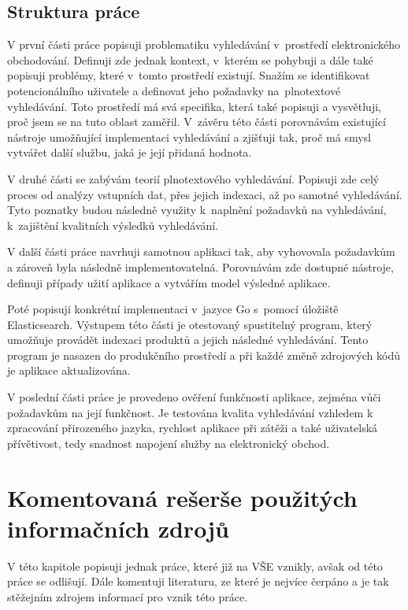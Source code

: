 \documentclass[FM,DP]{tulthesis}
\begin{document}
\section{Struktura práce}

V první části práce popisuji problematiku vyhledávání v~prostředí elektronického obchodování. 
Definuji zde jednak kontext, v~kterém se pohybuji a dále také popisuji problémy, 
které v~tomto prostředí existují. Snažím se identifikovat potencionálního uživatele 
a definovat jeho požadavky na~plnotextové vyhledávání. Toto prostředí má svá specifika, 
která také popisuji a vysvětluji, proč jsem se na tuto oblast zaměřil. V~závěru této části porovnávám
existující nástroje umožňující implementaci vyhledávání a zjišťuji tak, proč má smysl
vytvářet další službu, jaká je její přidaná hodnota.

V druhé části se zabývám teorií plnotextového vyhledávání. Popisuji zde celý
proces od analýzy vstupních dat, přes jejich indexaci, až po samotné vyhledávání. 
Tyto poznatky budou následně využity k~naplnění požadavků na vyhledávání, k~zajištění
kvalitních výsledků vyhledávání.

V další části práce navrhuji samotnou aplikaci tak, aby vyhovovala požadavkům a zároveň byla 
následně implementovatelná. Porovnávám zde dostupné nástroje, definuji případy užití aplikace
a vytvářím model výsledné aplikace.

Poté popisuji konkrétní implementaci v~jazyce Go s~pomocí úložiště 
Elasticsearch. Výstupem této části je otestovaný spustitelný program, který umožňuje provádět 
indexaci produktů a jejich následné vyhledávání. Tento program je nasazen do produkčního
prostředí a při každé změně zdrojových kódů je aplikace aktualizována.

V poslední části práce je provedeno ověření funkčnosti aplikace, zejména vůči požadavkům na její funkčnost.
Je testována kvalita vyhledávání vzhledem k zpracování přirozeného jazyka, rychlost aplikace
při zátěži a také uživatelská přívětivost, tedy snadnost napojení služby na elektronický obchod.


\chapter{Komentovaná rešerše použitých informačních zdrojů}

V této kapitole popisuji jednak práce, které již na VŠE vznikly, avšak od této práce se odlišují.
Dále komentuji literaturu, ze které je nejvíce čerpáno a je tak stěžejním zdrojem informací pro vznik
této práce.
\end{document}
